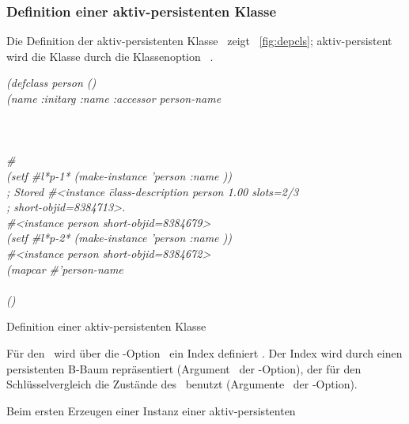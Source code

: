 \subsubsection{Definition einer aktiv-persistenten Klasse}
%
Die Definition der aktiv-persistenten Klasse \ zeigt
\figurename~\ref{fig:depcls}; ak\-tiv-per\-si\-stent wird die Klasse
durch die Klassenoption \ \oii.
%
\begin{listing}%
\listener\label{enu:depclsdc}
{\em(d}\={\em efclass person ()}\\
       \>{\em(}\={\em(name }\=\em{:initarg :name
                                  :accessor person-name}\\ 
\oi    \>      \>           \\
       \>      \\
\oii   {}\\
\#<persistent-metaclass person 100A952C>\\
\listener\label{enu:depclsmi}
{\em(setf \#l*p-1* (make-instance 'person
                                           :name \dq\nameii\dq))}\\ 
; Stored \#<instance \=class-description person 1.00 slots=2/3\\
;                    \>short-objid=8384713>.\\
\#<instance person short-objid=8384679>\\
\listener\label{enu:depclsmii}
{\em(setf \#l*p-2* (make-instance 'person :name \dq\namei\dq))}\\
\#<instance person short-objid=8384672>\\
\listener\label{enu:depclsps}
{\em (mapcar }\={\em\#'person-name}\\
 \\
(\dq\nameii\dq)
\caption{Definition einer aktiv-persistenten Klasse}%
\label{fig:depcls}%
\end{listing}%
%
F\"{u}r den \Slt\/ \ wird \"{u}ber die \Slt\/-Option
\ ein Index definiert \oi. Der Index wird durch einen
persistenten B-Baum repr\"{a}sentiert (Argument \ der
\Slt\/-Option), der f\"{u}r den  Schl\"{u}sselvergleich die Zust\"{a}nde des
\Slt[s]\/ \ benutzt (Argumente \ der
\Slt\/-Option).
%
\par{}Beim ersten Erzeugen einer Instanz einer aktiv-persistenten
